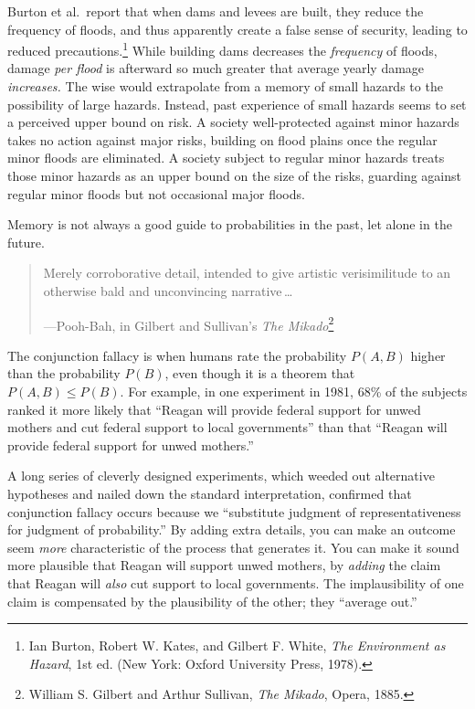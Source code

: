 {
 Burton et al.~report that when dams and levees are built, they
reduce the frequency of floods, and thus apparently create a false
sense of security, leading to reduced precautions.\footnote{Ian Burton, Robert W. Kates, and Gilbert F. White, \textit{The
Environment as Hazard}, 1st ed. (New York: Oxford University Press,
1978).}
While building dams decreases the \textit{frequency} of floods, damage
\textit{per flood} is afterward so much greater that average yearly
damage \textit{increases.} The wise would extrapolate from a memory of
small hazards to the possibility of large hazards. Instead, past
experience of small hazards seems to set a perceived upper bound on
risk. A society well-protected against minor hazards takes no action
against major risks, building on flood plains once the regular minor
floods are eliminated. A society subject to regular minor hazards
treats those minor hazards as an upper bound on the size of the risks,
guarding against regular minor floods but not occasional major floods.}

{
 Memory is not always a good guide to probabilities in the past,
let alone in the future.}

\myendsectiontext


\bigskip


\begin{quote}
{
 Merely corroborative detail, intended to give artistic
verisimilitude to an otherwise bald and unconvincing narrative\,\ldots}

{\raggedleft
 {}---Pooh-Bah, in Gilbert and Sullivan's
\textit{The Mikado}\footnote{William S. Gilbert and Arthur Sullivan, \textit{The Mikado},
Opera, 1885.}
\par}
\end{quote}


{
 The conjunction fallacy is when humans rate the probability $P(A,B)$
higher than the probability $P(B)$, even though it is a theorem that
$P(A,B) \leq P(B)$. For example, in one experiment in 1981, 68\% of
the subjects ranked it more likely that ``Reagan will
provide federal support for unwed mothers and cut federal support to
local governments'' than that
``Reagan will provide federal support for unwed
mothers.''}

{
 A long series of cleverly designed experiments, which weeded out
alternative hypotheses and nailed down the standard interpretation,
confirmed that conjunction fallacy occurs because we
``substitute judgment of representativeness for
judgment of probability.'' By adding extra details,
you can make an outcome seem \textit{more} characteristic of the
process that generates it. You can make it sound more plausible that
Reagan will support unwed mothers, by \textit{adding} the claim that
Reagan will \textit{also} cut support to local governments. The
implausibility of one claim is compensated by the plausibility of the
other; they ``average out.''}

